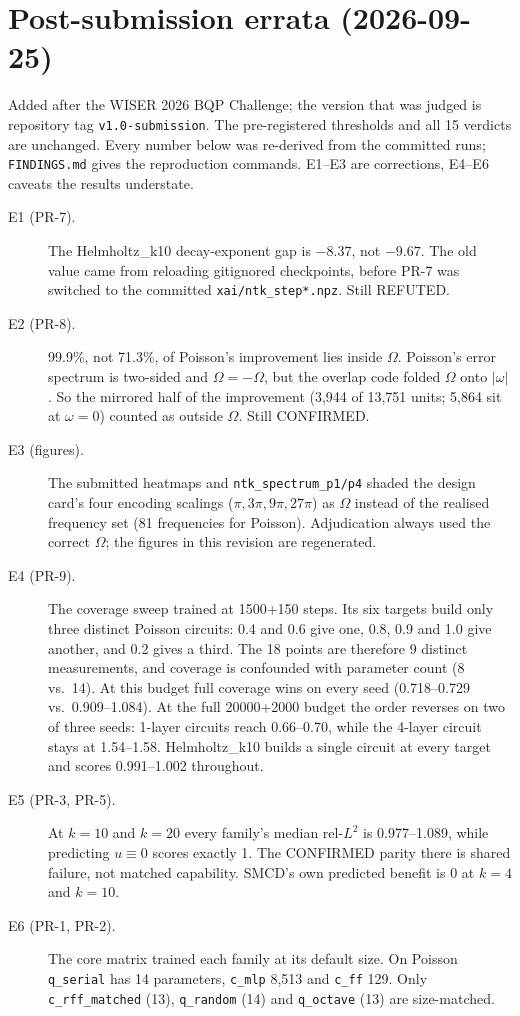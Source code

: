 \section{Post-submission errata (2026-09-25)}
\label{sec:errata}

Added after the WISER 2026 BQP Challenge; the version that was judged is repository tag
\texttt{v1.0-submission}. The pre-registered thresholds and all 15 verdicts are unchanged.
Every number below was re-derived from the committed runs; \texttt{FINDINGS.md} gives
the reproduction commands. E1--E3 are corrections, E4--E6 caveats the results understate.

\begin{description}
\item[E1 (PR-7).] The Helmholtz\_k10 decay-exponent gap is $-8.37$, not $-9.67$. The old
  value came from reloading gitignored checkpoints, before PR-7 was switched to the
  committed \texttt{xai/ntk\_step*.npz}. Still REFUTED.
\item[E2 (PR-8).] 99.9\%, not 71.3\%, of Poisson's improvement lies inside $\Omega$.
  Poisson's error spectrum is two-sided and $\Omega=-\Omega$, but the overlap code folded
  $\Omega$ onto $|\omega|$. So the mirrored half of the improvement (3{,}944 of 13{,}751
  units; 5{,}864 sit at $\omega=0$) counted as outside $\Omega$. Still CONFIRMED.
\item[E3 (figures).] The submitted heatmaps and \texttt{ntk\_spectrum\_p1/p4} shaded the
  design card's four encoding scalings ($\pi,3\pi,9\pi,27\pi$) as $\Omega$ instead of the
  realised frequency set (81 frequencies for Poisson). Adjudication always used the
  correct $\Omega$; the figures in this revision are regenerated.
\item[E4 (PR-9).] The coverage sweep trained at 1500+150 steps. Its six targets build
  only three distinct Poisson circuits: 0.4 and 0.6 give one, 0.8, 0.9 and 1.0 give
  another, and 0.2 gives a third. The 18 points are therefore 9 distinct measurements,
  and coverage is confounded with parameter count (8 vs.\ 14). At this budget full
  coverage wins on every seed (0.718--0.729 vs.\ 0.909--1.084). At the full 20000+2000
  budget the order reverses on two of three seeds: 1-layer circuits reach 0.66--0.70,
  while the 4-layer circuit stays at 1.54--1.58. Helmholtz\_k10 builds a single circuit
  at every target and scores 0.991--1.002 throughout.
\item[E5 (PR-3, PR-5).] At $k=10$ and $k=20$ every family's median rel-$L^2$ is
  0.977--1.089, while predicting $u\equiv0$ scores exactly 1. The CONFIRMED parity there
  is shared failure, not matched capability. SMCD's own predicted benefit is 0 at $k=4$
  and $k=10$.
\item[E6 (PR-1, PR-2).] The core matrix trained each family at its default size. On
  Poisson \texttt{q\_serial} has 14 parameters, \texttt{c\_mlp} 8{,}513 and
  \texttt{c\_ff} 129. Only \texttt{c\_rff\_matched} (13), \texttt{q\_random} (14) and
  \texttt{q\_octave} (13) are size-matched.
\end{description}
